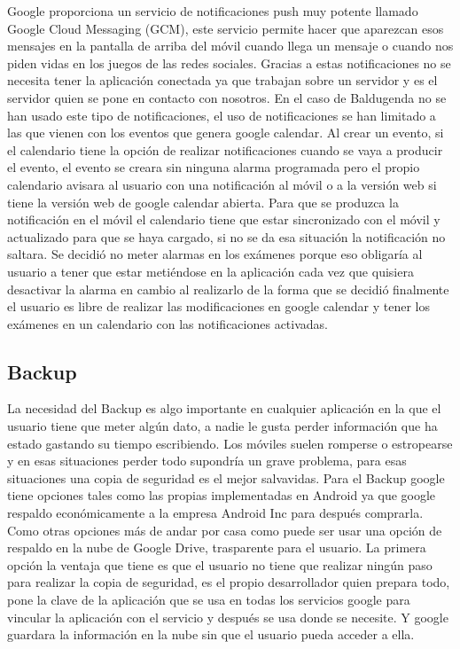 Google proporciona un servicio de notificaciones push muy potente llamado Google Cloud Messaging (GCM), este servicio permite hacer que aparezcan esos mensajes en la pantalla de arriba del móvil cuando llega un mensaje o cuando nos piden vidas en los juegos de las redes sociales.
Gracias a estas notificaciones no se necesita tener la aplicación conectada ya que trabajan sobre un servidor y es el servidor quien se pone en contacto con nosotros.
En el caso de Baldugenda no se han usado este tipo de notificaciones, el uso de notificaciones se han limitado a las que vienen con los eventos que genera google calendar.
Al crear un evento, si el calendario tiene la opción de realizar notificaciones cuando se vaya a producir el evento,   el evento se creara sin ninguna alarma programada pero el propio calendario avisara al usuario con una notificación al móvil o a la versión web si tiene la versión web de google calendar abierta.
Para que se produzca la notificación en el móvil el calendario tiene que estar sincronizado con el móvil y actualizado para que se haya cargado, si no se da esa situación la notificación no saltara.
Se decidió no meter alarmas en los exámenes porque eso obligaría al usuario a tener que estar metiéndose en la aplicación cada vez que quisiera desactivar la alarma en cambio al realizarlo de la forma que se decidió finalmente el usuario es libre de realizar las modificaciones en google calendar y tener los exámenes en un calendario con las notificaciones activadas.

\subsection{Backup}
\label{subsecc:Backup}

La necesidad del Backup es algo importante en cualquier aplicación en la que el usuario tiene que meter algún dato, a nadie le gusta perder información que ha estado gastando su tiempo escribiendo. Los móviles suelen romperse o estropearse y en esas situaciones perder todo supondría un grave problema, para esas situaciones una copia de seguridad es el mejor salvavidas.
Para el Backup google tiene opciones tales como las propias implementadas en Android ya que google respaldo económicamente a la empresa Android Inc para después comprarla. Como otras opciones más de andar por casa como puede ser usar una opción de respaldo en la nube de Google Drive, trasparente para el usuario.
La primera opción la ventaja que tiene es que el usuario no tiene que realizar ningún paso para realizar la copia de seguridad, es el propio desarrollador quien prepara todo, pone la clave de la aplicación que se usa en todas los servicios google para vincular la aplicación con el servicio y después se usa donde se necesite. Y google guardara la información en la nube sin que el usuario pueda acceder a ella.

